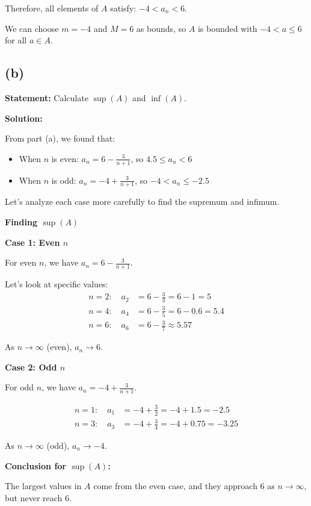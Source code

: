\documentclass[12pt,a4paper]{article}
\theoremstyle{definition}
\theoremstyle{remark}
\begin{document}
Therefore, all elements of $A$ satisfy: $-4 < a_n < 6$.

We can choose $m = -4$ and $M = 6$ as bounds, so $A$ is bounded with $-4 < a \leq 6$ for all $a \in A$.

\subsection*{(b)}

\textbf{Statement:} Calculate $\sup(A)$ and $\inf(A)$.

\textbf{Solution:}

From part (a), we found that:
\begin{itemize}
\item When $n$ is even: $a_n = 6 - \frac{3}{n+1}$, so $4.5 \leq a_n < 6$
\item When $n$ is odd: $a_n = -4 + \frac{3}{n+1}$, so $-4 < a_n \leq -2.5$
\end{itemize}

Let's analyze each case more carefully to find the supremum and infimum.

\textbf{Finding $\sup(A)$}

\textbf{Case 1: Even $n$}

For even $n$, we have $a_n = 6 - \frac{3}{n+1}$.

Let's look at specific values:
\begin{align}
n = 2: \quad a_2 &= 6 - \frac{3}{3} = 6 - 1 = 5\\
n = 4: \quad a_4 &= 6 - \frac{3}{5} = 6 - 0.6 = 5.4\\
n = 6: \quad a_6 &= 6 - \frac{3}{7} \approx 5.57
\end{align}

As $n \to \infty$ (even), $a_n \to 6$.

\textbf{Case 2: Odd $n$}

For odd $n$, we have $a_n = -4 + \frac{3}{n+1}$.

\begin{align}
n = 1: \quad a_1 &= -4 + \frac{3}{2} = -4 + 1.5 = -2.5\\
n = 3: \quad a_3 &= -4 + \frac{3}{4} = -4 + 0.75 = -3.25
\end{align}

As $n \to \infty$ (odd), $a_n \to -4$.

\textbf{Conclusion for $\sup(A)$:}

The largest values in $A$ come from the even case, and they approach $6$ as $n \to \infty$, but never reach $6$.
\end{document}
